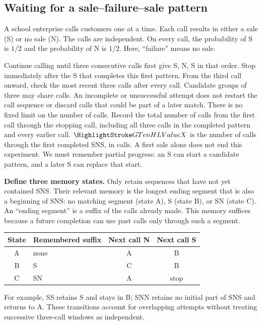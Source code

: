 \clearpage
\subsection{Waiting for a sale--failure--sale pattern}\label{prob:calls}
A school enterprise calls customers one at a time. Each call results in either a sale (S) or no sale (N). The calls are independent. On every call, the probability of S is $1/2$ and the probability of N is $1/2$. Here, ``failure'' means no sale.

Continue calling until three consecutive calls first give S, N, S in that order. Stop immediately after the S that completes this first pattern. From the third call onward, check the most recent three calls after every call. Candidate groups of three may share calls. An incomplete or unsuccessful attempt does not restart the call sequence or discard calls that could be part of a later match. There is no fixed limit on the number of calls. Record the total number of calls from the first call through the stopping call, including all three calls in the completed pattern and every earlier call.
$\cTwoValue{X}$ is the number of calls through the first completed SNS, in calls. A first sale alone does not end this experiment. We must remember partial progress: an S can start a candidate pattern, and a later S can replace that start.

\textbf{Define three memory states.} Only retain sequences that have not yet contained SNS. Their relevant memory is the longest ending segment that is also a beginning of SNS: no matching segment (state A), S (state B), or SN (state C). An ``ending segment'' is a suffix of the calls already made. This memory suffices because a future completion can use past calls only through such a segment.
\begin{center}\begin{tabular}{clcc}\toprule
State & Remembered suffix & Next call N & Next call S \\\midrule
A & none & A & B \\
B & S & C & B \\
C & SN & A & stop \\\bottomrule\end{tabular}\end{center}
For example, SS retains S and stays in B; SNN retains no initial part of SNS and returns to A. These transitions account for overlapping attempts without treating successive three-call windows as independent.

